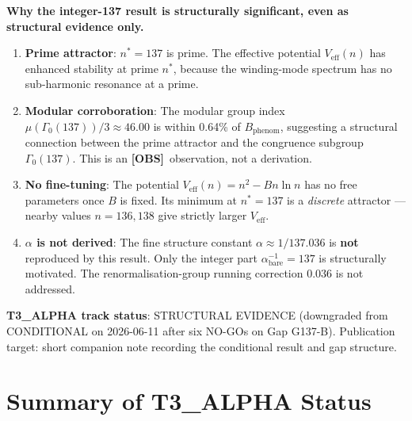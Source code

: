 \documentclass[12pt,a4paper]{article}
\theoremstyle{definition}
\theoremstyle{remark}
\newcommand{\OBS}{\textbf{[OBS]}}
\begin{document}
\begin{insightbox}
\textbf{Why the integer-137 result is structurally significant, even as
structural evidence only.}

\begin{enumerate}
\item \textbf{Prime attractor}: $n^* = 137$ is prime.  The effective potential
  $V_{\mathrm{eff}}(n)$ has enhanced stability at prime $n^*$, because
  the winding-mode spectrum has no sub-harmonic resonance at a prime.

\item \textbf{Modular corroboration}: The modular group index
  $\mu(\Gamma_0(137))/3 \approx 46.00$ is within 0.64\% of $B_{\mathrm{phenom}}$,
  suggesting a structural connection between the prime attractor and the
  congruence subgroup $\Gamma_0(137)$.  This is an \OBS\ observation, not a
  derivation.

\item \textbf{No fine-tuning}: The potential $V_{\mathrm{eff}}(n) = n^2 - Bn\ln n$
  has no free parameters once $B$ is fixed.  Its minimum at $n^* = 137$ is a
  \emph{discrete} attractor — nearby values $n = 136, 138$ give strictly larger
  $V_{\mathrm{eff}}$.

\item \textbf{$\alpha$ is not derived}: The fine structure constant
  $\alpha \approx 1/137.036$ is \textbf{not} reproduced by this result.  Only
  the integer part $\alpha^{-1}_{\mathrm{bare}} = 137$ is structurally motivated.
  The renormalisation-group running correction $0.036$ is not addressed.
\end{enumerate}

\textbf{T3\_ALPHA track status}: STRUCTURAL EVIDENCE (downgraded from
CONDITIONAL on 2026-06-11 after six NO-GOs on Gap G137-B).  Publication target:
short companion note recording the conditional result and gap structure.
\end{insightbox}

\section{Summary of T3\_ALPHA Status}
\label{sec:summary}
\end{document}
